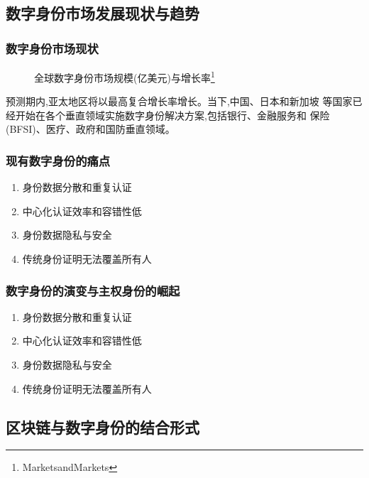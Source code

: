 \documentclass[11pt]{beamer}
\begin{document}
\subsection{数字身份市场发展现状与趋势}
\begin{frame}
	\frametitle{数字身份市场现状}
	\begin{figure}
		\caption{全球数字身份市场规模(亿美元)与增长率\footnote{MarketsandMarkets}}
	\end{figure}
	预测期内,亚太地区将以最高复合增长率增长。当下,中国、日本和新加坡
	等国家已经开始在各个垂直领域实施数字身份解决方案,包括银行、金融服务和
	保险(BFSI)、医疗、政府和国防垂直领域。
\end{frame}

\begin{frame}
	\frametitle{现有数字身份的痛点}
	\begin{enumerate}
		\item 身份数据分散和重复认证
		\item 中心化认证效率和容错性低
		\item 身份数据隐私与安全
		\item 传统身份证明无法覆盖所有人
	\end{enumerate}
\end{frame}

\begin{frame}
	\frametitle{数字身份的演变与主权身份的崛起}
	\begin{enumerate}
		\item 身份数据分散和重复认证
		\item 中心化认证效率和容错性低
		\item 身份数据隐私与安全
		\item 传统身份证明无法覆盖所有人
	\end{enumerate}
\end{frame}

\subsection{区块链与数字身份的结合形式}
\end{document}
